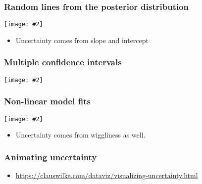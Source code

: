 \documentclass{beamer}
\newcommand{\bi}{\begin{itemize}}
\newcommand{\li}{\item}
\newcommand{\ei}{\end{itemize}}
\newcommand{\fig}[2]{\centerline{\texttt{[image: \#2]}}}
\newcommand{\bfr}[1]{\begin{frame}[fragile]\frametitle{{ #1 }}}
\begin{document}
\bfr{Random lines from the posterior distribution}
\fig{.8}{blue-jays-male-fitted-draws-1.png}
\bi
\li Uncertainty comes from slope and intercept
\ei
\end{frame}

\bfr{Multiple confidence intervals}
\fig{.8}{blue-jays-male-graded-conf-band-1.png}
\end{frame}

\bfr{Non-linear model fits}
\fig{1}{mpg-uncertain-1.png}
\bi
\li Uncertainty comes from wiggliness as well.
\ei
\end{frame}

\bfr{Animating uncertainty}
\bi
\li
\url{https://clauswilke.com/dataviz/visualizing-uncertainty.html}
\ei
\end{frame}
\end{document}
